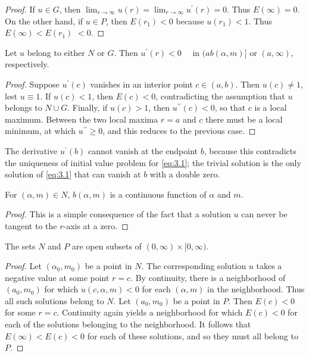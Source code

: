 \begin{proof}
  If $u \in G$, then $\lim _{r \rightarrow \infty} u(r)=\lim _{r \rightarrow \infty} u^{\prime}(r)=0$. Thus $E(\infty)=0$. On the other hand, if $u \in P$, then $E\left(r_1\right)<0$ because $u\left(r_1\right)<1$. Thus $E(\infty)<E\left(r_1\right)$ $<0$.
\end{proof}

\begin{lemma}\label{lemma:11}
  Let $u$ belong to either $N$ or $G$. Then $u^{\prime}(r)<0 \quad$ in $(a b(\alpha, m)]$ or $(a, \infty)$, respectively.
\end{lemma}

\begin{proof}
  Suppose $u^{\prime}(c)$ vanishes in an interior point $c \in(a, b)$. Then $u(c) \neq 1$, lest $u \equiv 1$. If $u(c)<1$, then $E(c)<0$, contradicting the assumption that $u$ belongs to $N \cup G$. Finally, if $u(c)>1$, then $u^{\prime \prime}(c)<0$, so that $c$ is a local maximum. Between the two local maxima $r=a$ and $c$ there must be a local minimum, at which $u^{\prime \prime} \geq 0$, and this reduces to the previous case.
\end{proof}

The derivative $u^{\prime}(b)$ cannot vanish at the endpoint $b$,
because this contradicts the uniqueness of initial value problem for \eqref{eq:3.1};
the trivial solution is the only solution of \eqref{eq:3.1} that can vanish at $b$
with a double zero.


\begin{lemma}\label{lemma:12}
  For $(\alpha, m) \in N$, $b(\alpha, m)$ is a continuous function of $\alpha$ and $m$.
\end{lemma}

\begin{proof}
  This is a simple consequence of the fact that a solution $u$ can never be tangent to the $r$-axis at a zero.
\end{proof}

\begin{lemma}\label{lemma:13}
  The sets $N$ and $P$ are open subsets of $(0, \infty) \times[0, \infty)$.
\end{lemma}

\begin{proof}
  Let $\left(\alpha_0, m_0\right)$ be a point in $N$. The corresponding solution $u$ takes a negative value at some point $r=c$. By continuity, there is a neighborhood of $\left(a_0, m_0\right)$ for which $u(c, \alpha, m)<0$ for each $(\alpha, m)$ in the neighborhood. Thus all such solutions belong to $N$. Let $\left(a_0, m_0\right)$ be a point in $P$. Then $E(c)<0$ for some $r=c$. Continuity again yields a neighborhood for which $E(c)<0$ for each of the solutions belonging to the neighborhood. It follows that $E(\infty)<E(c)<0$ for each of these solutions, and so they must all belong to $P$.
\end{proof}

